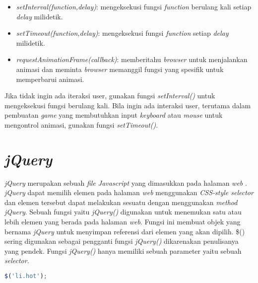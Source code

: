 \begin{itemize}
	\item \textit{setInterval(function,delay)}: mengeksekusi fungsi \textit{function} berulang kali setiap \textit{delay} milidetik.
	\item \textit{setTimeout(function,delay)}: mengeksekusi fungsi \textit{function} setiap \textit{delay} milidetik.
	\item \textit{requestAnimationFrame(callback)}: memberitahu \textit{browser} untuk menjalankan animasi dan meminta \textit{browser} memanggil fungsi yang spesifik untuk memperbarui animasi.
\end{itemize}

Jika tidak ingin ada iteraksi user, gunakan fungsi \textit{setInterval()} untuk mengeksekusi fungsi berulang kali. Bila ingin ada interaksi user, terutama dalam pembuatan \textit{game} yang membutuhkan input \textit{keyboard} atau \textit{mouse} untuk mengontrol animasi, gunakan fungsi \textit{setTimeout()}.

\section{\textit{jQuery}}
\textit{jQuery} merupakan sebuah \textit{file Javascript} yang dimasukkan pada halaman \textit{web} \cite{duckett2014javascript}. \textit{jQuery} dapat memilih elemen pada halaman \textit{web} menggunakan \textit{CSS-style selector} dan elemen tersebut dapat melakukan sesuatu dengan menggunakan \textit{method jQuery}. Sebuah fungsi yaitu \textit{jQuery()} digunakan untuk menemukan satu atau lebih elemen yang berada pada halaman \textit{web}. Fungsi ini membuat objek yang bernama \textit{jQuery} untuk menyimpan referensi dari elemen yang akan dipilih. \$() sering digunakan sebagai pengganti fungsi \textit{jQuery()} dikarenakan penulisanya yang pendek. Fungsi \textit{jQuery()} hanya memiliki sebuah parameter yaitu sebuah \textit{selector}.

\begin{lstlisting}[language=Javascript, caption=Mendapatkan elemen menggunakan \textit{CSS-style selector}, label={lst:jQuery1}]
	$('li.hot');
\end{lstlisting}

